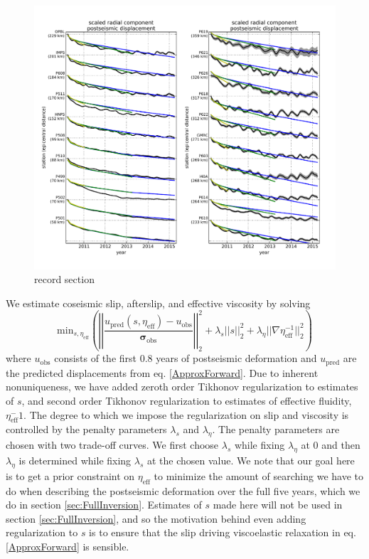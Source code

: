 \documentclass[1p]{elsarticle}
\begin{document}
\begin{figure}
\includegraphics[scale=0.7]{Figures/RecordSectionDuration}
\centering 
\caption{record section}
\label{fig:RecordSection1}
\end{figure}

We estimate coseismic slip, afterslip, and effective viscosity by solving 
\begin{equation}\label{ObjectiveFunction}
 \mathrm{min}_{s,\eta_\mathrm{eff}} \left(\left|\left|
 \frac{u_\mathrm{pred}(s,\eta_\mathrm{eff}) - u_\mathrm{obs}}
 {\mathbf{\sigma_\mathrm{obs}}}\right|\right|_2^2 + 
 \lambda_s||s||_2^2 + 
 \lambda_\eta||\nabla \eta_{\mathrm{eff}}^{-1}||_2^2\right)
\end{equation} 
where $u_\mathrm{obs}$ consists of the first 0.8 years of postseismic deformation and $u_\mathrm{pred}$ are the predicted displacements from eq. \ref{ApproxForward}.  Due to inherent nonuniqueness, we have added zeroth order Tikhonov regularization to estimates of $s$, and second order Tikhonov regularization to estimates of effective fluidity, $\eta_\mathrm{eff}^-1$. The degree to which we impose the regularization on slip and viscosity is controlled by the penalty parameters $\lambda_s$ and $\lambda_\eta$.  The penalty parameters are chosen with two trade-off curves. We first choose $\lambda_s$ while fixing $\lambda_\eta$ at 0 and then $\lambda_\eta$ is determined while fixing $\lambda_s$ at the chosen value. We note that our goal here is to get a prior constraint on $\eta_{\mathrm{eff}}$ to minimize the amount of searching we have to do when describing the postseismic deformation over the full five years, which we do in section \ref{sec:FullInversion}.  Estimates of $s$ made here will not be used in section \ref{sec:FullInversion}, and so the motivation behind even adding regularization to $s$ is to ensure that the slip driving viscoelastic relaxation in eq. \ref{ApproxForward} is sensible.  
\end{document}

